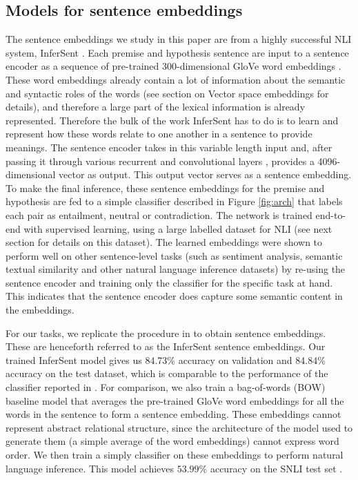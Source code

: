 \subsection{Models for sentence embeddings}
The sentence embeddings we study in this paper are from a highly successful NLI system, InferSent \citep{Conneau:2017uf}. Each premise and hypothesis sentence are input to a sentence encoder as a sequence of pre-trained 300-dimensional GloVe word embeddings \citep{pennington14}. These word embeddings already contain a lot of information about the semantic and syntactic roles of the words (see section on Vector space embeddings for details), and therefore a large part of the lexical information is already represented. Therefore the bulk of the work InferSent has to do is to learn and represent how these words relate to one another in a sentence to provide meanings. The sentence encoder takes in this variable length input and, after passing it through various recurrent and convolutional layers \cite[see][for details]{Conneau:2017uf}, provides a 4096-dimensional vector as output. This output vector serves as a sentence embedding. To make the final inference, these sentence embeddings for the premise and hypothesis are fed to a simple classifier described in Figure \ref{fig:arch} that labels each pair as entailment, neutral or contradiction. The network is trained end-to-end with supervised learning, using a large labelled dataset for NLI (see next section for details on this dataset). The learned embeddings were shown to perform well on other sentence-level tasks (such as sentiment analysis, semantic textual similarity and other natural language inference datasets) by re-using the sentence encoder and training only the classifier for the specific task at hand. This indicates that the sentence encoder does capture some semantic content in the embeddings.

For our tasks, we replicate the procedure in \citet{Conneau:2017uf} to obtain sentence embeddings. These are henceforth referred to as the InferSent sentence embeddings. Our trained InferSent model gives us 84.73\% accuracy on validation and 84.84\% accuracy on the test dataset, which is comparable to the performance of the classifier reported in \citet{Conneau:2017uf}. For comparison, we also train a bag-of-words (BOW) baseline model that averages the pre-trained GloVe word embeddings for all the words in the sentence to form a sentence embedding. These embeddings cannot represent abstract relational structure, since the architecture of the model used to generate them (a simple average of the word embeddings) cannot express word order. We then train a simply classifier on these embeddings to perform natural language inference. This model achieves $53.99\%$ accuracy on the SNLI test set \citep[comparable to the BOW performance reported in][]{Conneau:2017uf}.

